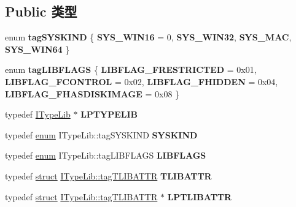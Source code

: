 \subsection*{Public 类型}
\begin{DoxyCompactItemize}
\item 
\mbox{\label{interface_i_type_lib_a4392086aa25ac069e90b8251e0b2907b}} 
enum {\bfseries tag\+S\+Y\+S\+K\+I\+ND} \{ {\bfseries S\+Y\+S\+\_\+\+W\+I\+N16} = 0, 
{\bfseries S\+Y\+S\+\_\+\+W\+I\+N32}, 
{\bfseries S\+Y\+S\+\_\+\+M\+AC}, 
{\bfseries S\+Y\+S\+\_\+\+W\+I\+N64}
 \}
\item 
\mbox{\label{interface_i_type_lib_acc74327087fa7a3a695695ca5ccfb227}} 
enum {\bfseries tag\+L\+I\+B\+F\+L\+A\+GS} \{ {\bfseries L\+I\+B\+F\+L\+A\+G\+\_\+\+F\+R\+E\+S\+T\+R\+I\+C\+T\+ED} = 0x01, 
{\bfseries L\+I\+B\+F\+L\+A\+G\+\_\+\+F\+C\+O\+N\+T\+R\+OL} = 0x02, 
{\bfseries L\+I\+B\+F\+L\+A\+G\+\_\+\+F\+H\+I\+D\+D\+EN} = 0x04, 
{\bfseries L\+I\+B\+F\+L\+A\+G\+\_\+\+F\+H\+A\+S\+D\+I\+S\+K\+I\+M\+A\+GE} = 0x08
 \}
\item 
\mbox{\label{interface_i_type_lib_a8c2f4992ea0859cf6d4966bf16c8870e}} 
typedef \hyperlink{interface_i_type_lib}{I\+Type\+Lib} $\ast$ {\bfseries L\+P\+T\+Y\+P\+E\+L\+IB}
\item 
\mbox{\label{interface_i_type_lib_a73c1b11ac23355df4a2de4c2790e223a}} 
typedef \hyperlink{interfaceenum}{enum} I\+Type\+Lib\+::tag\+S\+Y\+S\+K\+I\+ND {\bfseries S\+Y\+S\+K\+I\+ND}
\item 
\mbox{\label{interface_i_type_lib_a3aecba5ffd52a8d8cb0400d67d524306}} 
typedef \hyperlink{interfaceenum}{enum} I\+Type\+Lib\+::tag\+L\+I\+B\+F\+L\+A\+GS {\bfseries L\+I\+B\+F\+L\+A\+GS}
\item 
\mbox{\label{interface_i_type_lib_ac88c237343ab79bdc2b181c197118ba3}} 
typedef \hyperlink{interfacestruct}{struct} \hyperlink{struct_i_type_lib_1_1tag_t_l_i_b_a_t_t_r}{I\+Type\+Lib\+::tag\+T\+L\+I\+B\+A\+T\+TR} {\bfseries T\+L\+I\+B\+A\+T\+TR}
\item 
\mbox{\label{interface_i_type_lib_a3c000db3d568cb474832a67abc62da7e}} 
typedef \hyperlink{interfacestruct}{struct} \hyperlink{struct_i_type_lib_1_1tag_t_l_i_b_a_t_t_r}{I\+Type\+Lib\+::tag\+T\+L\+I\+B\+A\+T\+TR} $\ast$ {\bfseries L\+P\+T\+L\+I\+B\+A\+T\+TR}
\end{DoxyCompactItemize}
